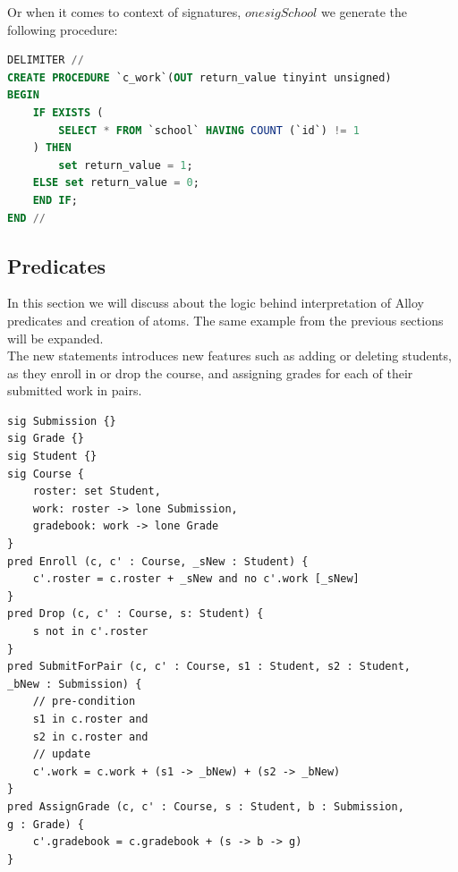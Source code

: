 \documentclass[oneside]{book}
\begin{document}
Or when it comes to context of signatures, $one sig School {}$ we generate the following procedure:

\begin{lstlisting}[escapechar=@,language=SQL]
DELIMITER //
CREATE PROCEDURE `c_work`(OUT return_value tinyint unsigned)
BEGIN
	IF EXISTS (
		SELECT * FROM `school` HAVING COUNT (`id`) != 1
	) THEN
		set return_value = 1;
	ELSE set return_value = 0;
	END IF;
END //
\end{lstlisting}

\subsection{Predicates}
\label{sec:predicatesgen}
In this section we will discuss about the logic behind interpretation of Alloy predicates and creation of atoms. The same example from the previous sections will be expanded.\\

\noindent The new statements introduces new features such as adding or deleting students, as they enroll in or drop the course, and assigning grades for each of their submitted work in pairs.\\

\begin{lstlisting}
sig Submission {}
sig Grade {}
sig Student {}
sig Course {
	roster: set Student,
	work: roster -> lone Submission,
	gradebook: work -> lone Grade
}
pred Enroll (c, c' : Course, _sNew : Student) {
	c'.roster = c.roster + _sNew and no c'.work [_sNew]
}
pred Drop (c, c' : Course, s: Student) {
	s not in c'.roster 
}
pred SubmitForPair (c, c' : Course, s1 : Student, s2 : Student, 
_bNew : Submission) {
	// pre-condition
	s1 in c.roster and
	s2 in c.roster and
	// update
	c'.work = c.work + (s1 -> _bNew) + (s2 -> _bNew)
}
pred AssignGrade (c, c' : Course, s : Student, b : Submission, 
g : Grade) {
	c'.gradebook = c.gradebook + (s -> b -> g)
}
\end{lstlisting}
\end{document}
